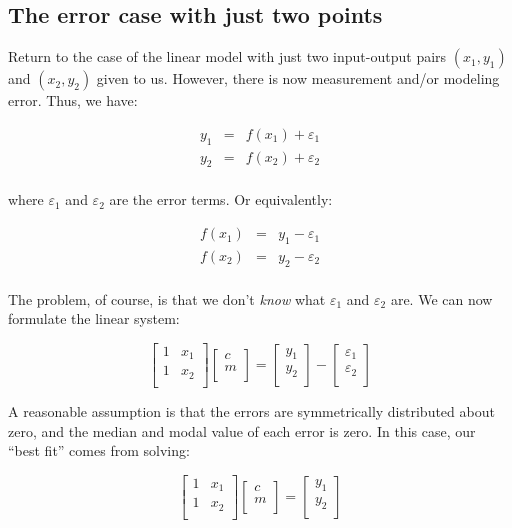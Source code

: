 \documentclass[10pt]{amsart}
\begin{document}
\subsection{The error case with just two points}

Return to the case of the linear model with just two input-output
pairs $(x_1,y_1)$ and $(x_2,y_2)$ given to us. However, there is now
measurement and/or modeling error. Thus, we have:

\begin{eqnarray*}
  y_1 & = & f(x_1) + \varepsilon_1 \\
  y_2 & = & f(x_2) + \varepsilon_2 \\
\end{eqnarray*}

where $\varepsilon_1$ and $\varepsilon_2$ are the error terms. Or equivalently:

\begin{eqnarray*}
  f(x_1) & = & y_1 - \varepsilon_1 \\
  f(x_2) & = & y_2 - \varepsilon_2 \\
\end{eqnarray*}

The problem, of course, is that we don't {\em know} what $\varepsilon_1$ and
$\varepsilon_2$ are. We can now formulate the linear system:

$$\left[\begin{matrix} 1 & x_1 \\ 1 & x_2 \\\end{matrix}\right]\left[\begin{matrix} c \\ m \\\end{matrix}\right] = \left[\begin{matrix} y_1 \\ y_2 \\\end{matrix}\right] - \left[\begin{matrix} \varepsilon_1 \\ \varepsilon_2 \\\end{matrix}\right]$$

A reasonable assumption is that the errors are symmetrically
distributed about zero, and the median and modal value of each error
is zero. In this case, our ``best fit'' comes from solving:

$$\left[\begin{matrix} 1 & x_1\\ 1 & x_2 \\\end{matrix}\right]\left[\begin{matrix} c \\ m \\\end{matrix}\right] = \left[\begin{matrix} y_1 \\ y_2 \\\end{matrix}\right]$$
\end{document}
